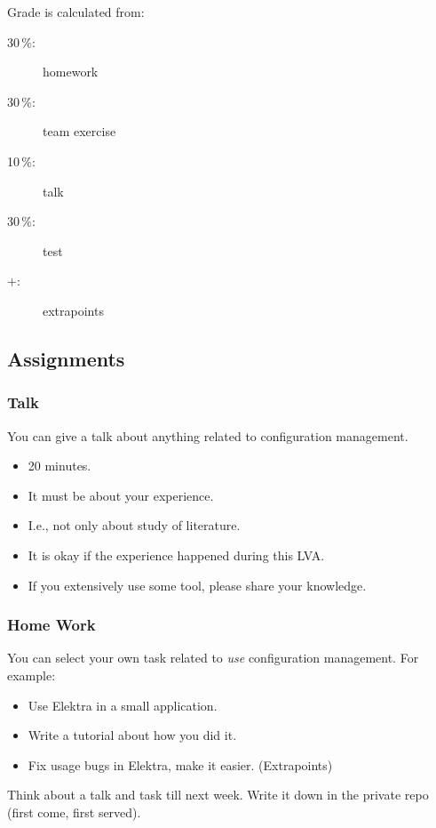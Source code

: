 \documentclass{beamer}
\begin{document}
\begin{frame}
	Grade is calculated from:
	\begin{description}
	\item[30\,\%:] homework
	\item[30\,\%:] team exercise
	\item[10\,\%:] talk
	\item[30\,\%:] test
	\item[+:] extrapoints
	\end{description}
\end{frame}

\subsection{Assignments}
\begin{frame}
	\frametitle{Talk}
	You can give a talk about anything related to configuration management.
	\begin{itemize}
		\item 20 minutes.
		\item It must be about your experience.
		\item I.e., not only about study of literature.
		\item It is okay if the experience happened during this LVA.
		\item If you extensively use some tool, please share your knowledge.
	\end{itemize}
\end{frame}

\begin{frame}
	\frametitle{Home Work}
	You can select your own task related to \emph{use} configuration management.
	For example:
	\begin{itemize}
		\item Use Elektra in a small application.
		\item Write a tutorial about how you did it.
		\item Fix usage bugs in Elektra, make it easier. (Extrapoints)
	\end{itemize}
\end{frame}

\begin{assignment}
	\begin{task}
	Think about a talk and task till next week.
	Write it down in the private repo (first come, first served).
	\end{task}
\end{assignment}
\end{document}

